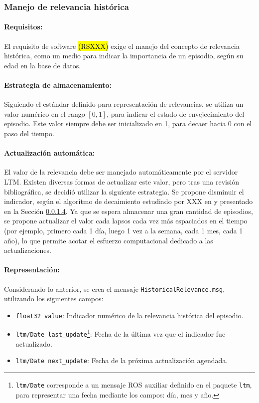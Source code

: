 \subsubsection{Manejo de relevancia histórica}

\paragraph{Requisitos:}
El requisito de software \hl{(RSXXX)} exige el manejo del concepto de relevancia histórica, como un medio para indicar la importancia de un episodio, según su edad en la base de datos. 

\paragraph{Estrategia de almacenamiento:}
Siguiendo el estándar definido para representación de relevancias, se utiliza un valor numérico en el rango $[0, 1]$, para  indicar el estado de envejecimiento del episodio. Este valor siempre debe ser inicializado en 1, para decaer hacia 0 con el paso del tiempo.


\paragraph{Actualización automática:}
El valor de la relevancia debe ser manejado automáticamente por el servidor LTM. Existen diversas formas de actualizar este valor, pero tras una revisión bibliográfica, se decidió utilizar la siguiente estrategia. Se propone disminuir el indicador, según el algoritmo de decaimiento estudiado por XXX en \cite{} y presentado en la Sección \ref{}. Ya que se espera almacenar una gran cantidad de episodios, se propone actualizar el valor cada lapsos cada vez más espaciados en el tiempo (por ejemplo, primero cada 1 día, luego 1 vez a la semana, cada 1 mes, cada 1 año), lo que permite acotar el esfuerzo computacional dedicado a las actualizaciones.


\paragraph{Representación:}
Considerando lo anterior, se crea el mensaje \texttt{HistoricalRelevance.msg}, utilizando los siguientes campos:
\begin{itemize}
	\item \texttt{float32 value}: Indicador numérico de la relevancia histórica del episodio.
	\item \texttt{ltm/Date last\_update}\footnote{\texttt{ltm/Date} corresponde a un mensaje ROS auxiliar definido en el paquete \texttt{ltm}, para representar una fecha mediante los campos: día, mes y año.}: Fecha de la última vez que el indicador fue actualizado.
	\item \texttt{ltm/Date next\_update}: Fecha de la próxima actualización agendada.
\end{itemize}

